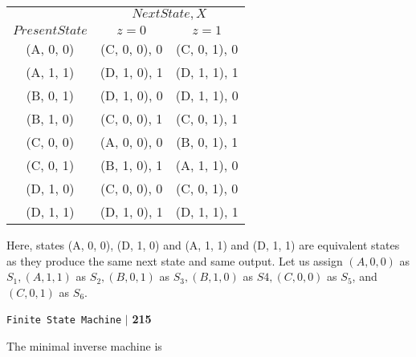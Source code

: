 \documentclass{article}
\begin{document}
\begin{center}
\begin{tabular}{ccc}
 \hline

 \hline

 \hline

 \hline
 & \multicolumn{2}{c}{$Next State,X$}\\
 \cline{2-3}
 $Present State$ &  $z=0$ & $z=1$\\
\hline
(A, 0, 0)  &  (C, 0, 0), 0  &  (C, 0, 1), 0\\
(A, 1, 1)  &  (D, 1, 0), 1  &  (D, 1, 1), 1\\
(B, 0, 1)  &  (D, 1, 0), 0  &  (D, 1, 1), 0\\
(B, 1, 0)  &  (C, 0, 0), 1  &  (C, 0, 1), 1\\
(C, 0, 0)  &  (A, 0, 0), 0  &  (B, 0, 1), 1\\
(C, 0, 1)  &  (B, 1, 0), 1  &  (A, 1, 1), 0\\
(D, 1, 0)  &  (C, 0, 0), 0  &  (C, 0, 1), 0\\
(D, 1, 1)  &  (D, 1, 0), 1  &  (D, 1, 1), 1\\
 \hline

 \hline

 \hline

 \hline
\end{tabular}
\end{center}

\vspace*{0.4cm}
\hspace*{0.5cm} Here, states (A, 0, 0), (D, 1, 0) and (A, 1, 1) and (D, 1, 1) are equivalent states as they produce
the same next state and same output. Let us assign $(A, 0, 0)$ as $S_1, (A, 1, 1)$ as $S_2, (B, 0, 1)$ as $S_3,
(B, 1, 0)$ as $S4, (C, 0, 0)$ as $S_5$, and $(C, 0, 1)$ as $S_6$.\\

\newpage
\begin{flushright}
 \texttt{Finite State Machine} \hspace*{0.1cm}\textbf{$|$} \hspace*{0.1cm} \textbf{215}\hspace*{0.1cm}
\end{flushright}
\vspace*{1cm}

\hspace*{0.5cm} The minimal inverse machine is\\
\end{document}
